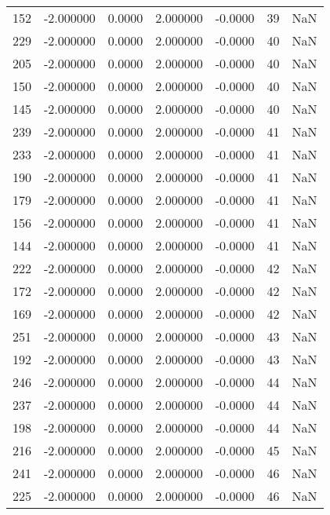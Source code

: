 \begin{tabular}{rrrrrrr}
152 &  -2.000000 &    0.0000 &   2.000000 &     -0.0000 &          39 & NaN \\
229 &  -2.000000 &    0.0000 &   2.000000 &     -0.0000 &          40 & NaN \\
205 &  -2.000000 &    0.0000 &   2.000000 &     -0.0000 &          40 & NaN \\
150 &  -2.000000 &    0.0000 &   2.000000 &     -0.0000 &          40 & NaN \\
145 &  -2.000000 &    0.0000 &   2.000000 &     -0.0000 &          40 & NaN \\
239 &  -2.000000 &    0.0000 &   2.000000 &     -0.0000 &          41 & NaN \\
233 &  -2.000000 &    0.0000 &   2.000000 &     -0.0000 &          41 & NaN \\
190 &  -2.000000 &    0.0000 &   2.000000 &     -0.0000 &          41 & NaN \\
179 &  -2.000000 &    0.0000 &   2.000000 &     -0.0000 &          41 & NaN \\
156 &  -2.000000 &    0.0000 &   2.000000 &     -0.0000 &          41 & NaN \\
144 &  -2.000000 &    0.0000 &   2.000000 &     -0.0000 &          41 & NaN \\
222 &  -2.000000 &    0.0000 &   2.000000 &     -0.0000 &          42 & NaN \\
172 &  -2.000000 &    0.0000 &   2.000000 &     -0.0000 &          42 & NaN \\
169 &  -2.000000 &    0.0000 &   2.000000 &     -0.0000 &          42 & NaN \\
251 &  -2.000000 &    0.0000 &   2.000000 &     -0.0000 &          43 & NaN \\
192 &  -2.000000 &    0.0000 &   2.000000 &     -0.0000 &          43 & NaN \\
246 &  -2.000000 &    0.0000 &   2.000000 &     -0.0000 &          44 & NaN \\
237 &  -2.000000 &    0.0000 &   2.000000 &     -0.0000 &          44 & NaN \\
198 &  -2.000000 &    0.0000 &   2.000000 &     -0.0000 &          44 & NaN \\
216 &  -2.000000 &    0.0000 &   2.000000 &     -0.0000 &          45 & NaN \\
241 &  -2.000000 &    0.0000 &   2.000000 &     -0.0000 &          46 & NaN \\
225 &  -2.000000 &    0.0000 &   2.000000 &     -0.0000 &          46 & NaN \\

\end{tabular}
